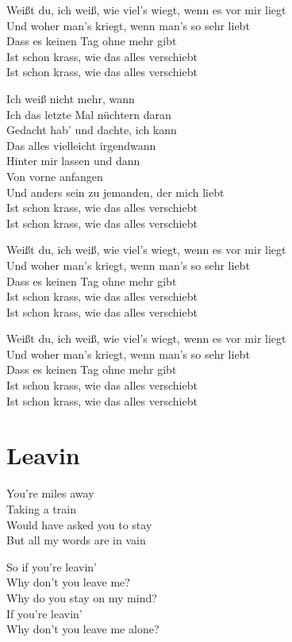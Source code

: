 \documentclass[]{book}
\begin{document}
Weißt du, ich weiß, wie viel's wiegt, wenn es vor mir liegt\\
Und woher man's kriegt, wenn man's so sehr liebt\\
Dass es keinen Tag ohne mehr gibt\\
Ist schon krass, wie das alles verschiebt\\
Ist schon krass, wie das alles verschiebt

Ich weiß nicht mehr, wann\\
Ich das letzte Mal nüchtern daran\\
Gedacht hab' und dachte, ich kann\\
Das alles vielleicht irgendwann\\
Hinter mir lassen und dann\\
Von vorne anfangen\\
Und anders sein zu jemanden, der mich liebt\\
Ist schon krass, wie das alles verschiebt\\
Ist schon krass, wie das alles verschiebt

Weißt du, ich weiß, wie viel's wiegt, wenn es vor mir liegt\\
Und woher man's kriegt, wenn man's so sehr liebt\\
Dass es keinen Tag ohne mehr gibt\\
Ist schon krass, wie das alles verschiebt\\
Ist schon krass, wie das alles verschiebt

Weißt du, ich weiß, wie viel's wiegt, wenn es vor mir liegt\\
Und woher man's kriegt, wenn man's so sehr liebt\\
Dass es keinen Tag ohne mehr gibt\\
Ist schon krass, wie das alles verschiebt\\
Ist schon krass, wie das alles verschiebt

\hypertarget{leavin}{%
\section{Leavin}\label{leavin}}

You're miles away\\
Taking a train\\
Would have asked you to stay\\
But all my words are in vain

So if you're leavin'\\
Why don't you leave me?\\
Why do you stay on my mind?\\
If you're leavin'\\
Why don't you leave me alone?
\end{document}
